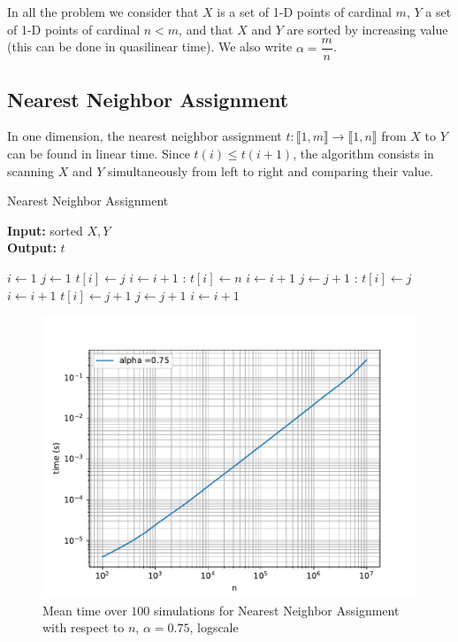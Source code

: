 \documentclass[a4paper,12pt]{article}
\begin{document}
In all the problem we consider that $X$ is a set of 1-D points of cardinal $m$, $Y$ a set of 1-D points of cardinal $n<m$, and that $X$ and $Y$ are sorted by increasing value (this can be done in quasilinear time). We also write $\alpha = \dfrac{m}{n}$.

\subsection{Nearest Neighbor Assignment}

In one dimension, the nearest neighbor assignment $t : \llbracket 1,m \rrbracket \rightarrow \llbracket 1,n \rrbracket$ from $X$ to $Y$ can be found in linear time. Since $t(i) \leqslant t(i+1)$, the algorithm consists in scanning $X$ and $Y$ simultaneously from left to right and comparing their value. \\

\begin{algorithm}
\caption{Nearest Neighbor Assignment}\label{t}
\hspace*{\algorithmicindent} \textbf{Input:} sorted $X,Y$\\
\hspace*{\algorithmicindent} \textbf{Output:} $t$ 
\begin{algorithmic}[1]
\State $i\gets 1$
\State $j\gets 1$
		\State $t[i] \gets j$
		\State $i \gets i+1$
    :
        \State $t[i] \gets n$
        \State $i \gets i+1$
        \State $j \gets j+1$
    :
        \State $t[i] \gets j$
        \State $i \gets i+1$
    \Else
        \State $t[i] \gets j+1$
        \State $j \gets j+1$
        \State $i \gets i+1$
    \EndIf
\EndWhile
\State {}
\end{algorithmic}
\end{algorithm}


\begin{figure}[H]
\includegraphics[width = \columnwidth]{t_time.pdf}
\caption{Mean time over $100$ simulations for Nearest Neighbor Assignment with respect to $n$, $\alpha=0.75$, logscale}\label{t_time}
\end{figure}
\end{document}
